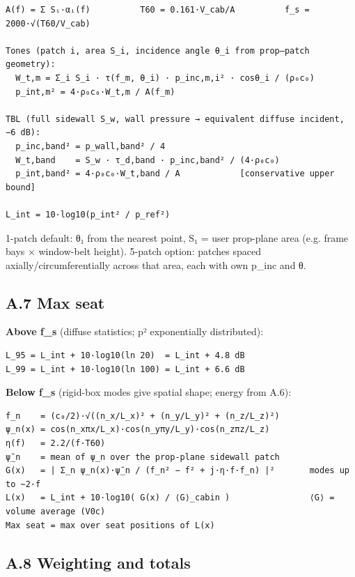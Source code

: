 \documentclass[10pt,a4paper]{article}
\begin{document}
\begin{Verbatim}[breaklines,fontsize=\small,frame=single,rulecolor=\color{gray}]
A(f) = Σ Sᵢ·αᵢ(f)          T60 = 0.161·V_cab/A          f_s = 2000·√(T60/V_cab)

Tones (patch i, area S_i, incidence angle θ_i from prop–patch geometry):
  W_t,m = Σ_i S_i · τ(f_m, θ_i) · p_inc,m,i² · cosθ_i / (ρ₀c₀)
  p_int,m² = 4·ρ₀c₀·W_t,m / A(f_m)

TBL (full sidewall S_w, wall pressure → equivalent diffuse incident, −6 dB):
  p_inc,band² = p_wall,band² / 4
  W_t,band    = S_w · τ_d,band · p_inc,band² / (4·ρ₀c₀)
  p_int,band² = 4·ρ₀c₀·W_t,band / A            [conservative upper bound]

L_int = 10·log10(p_int² / p_ref²)
\end{Verbatim}

1-patch default: θ₁ from the nearest point, S₁ = user prop-plane area (e.g. frame bays × window-belt height). 5-patch option: patches spaced axially/circumferentially across that area, each with own p\_inc and θ.

\subsection*{A.7 Max seat}

\textbf{Above f\_s} (diffuse statistics; p² exponentially distributed):

\begin{Verbatim}[breaklines,fontsize=\small,frame=single,rulecolor=\color{gray}]
L_95 = L_int + 10·log10(ln 20)  = L_int + 4.8 dB
L_99 = L_int + 10·log10(ln 100) = L_int + 6.6 dB
\end{Verbatim}

\textbf{Below f\_s} (rigid-box modes give spatial shape; energy from A.6):

\begin{Verbatim}[breaklines,fontsize=\small,frame=single,rulecolor=\color{gray}]
f_n    = (c₀/2)·√((n_x/L_x)² + (n_y/L_y)² + (n_z/L_z)²)
ψ_n(x) = cos(n_xπx/L_x)·cos(n_yπy/L_y)·cos(n_zπz/L_z)
η(f)   = 2.2/(f·T60)
ψ̄_n    = mean of ψ_n over the prop-plane sidewall patch
G(x)   = | Σ_n ψ_n(x)·ψ̄_n / (f_n² − f² + j·η·f·f_n) |²       modes up to ~2·f
L(x)   = L_int + 10·log10( G(x) / ⟨G⟩_cabin )                ⟨G⟩ = volume average (V0c)
Max seat = max over seat positions of L(x)
\end{Verbatim}

\subsection*{A.8 Weighting and totals}
\end{document}
